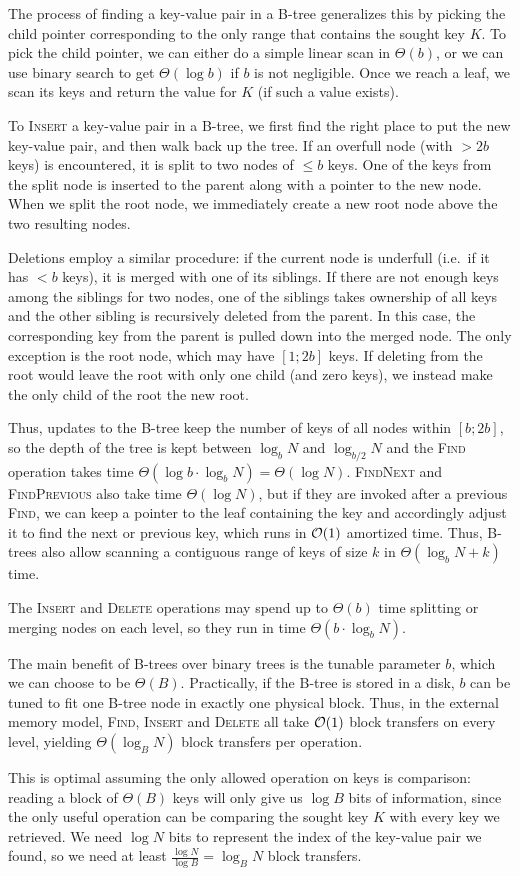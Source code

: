 The process of finding a key-value pair in a B-tree generalizes this
by picking the child pointer corresponding to the only range that contains
the sought key $K$. To pick the child pointer, we can either do a simple
linear scan in $\Theta(b)$, or we can use binary search to get
$\Theta(\log b)$ if $b$ is not negligible.
Once we reach a leaf, we scan its keys and return the value for $K$
(if such a value exists).

To \textsc{Insert} a key-value pair in a B-tree, we first find the right
place to put the new key-value pair, and then walk back up the tree.
If an overfull node (with $> 2b$ keys) is encountered, it is split
to two nodes of $\leq b$ keys. One of the keys from the split node
is inserted to the parent along with a pointer to the new node.
When we split the root node, we immediately create a new root node above the
two resulting nodes.

Deletions employ a similar procedure: if the current node is underfull
(i.e.\ if it has $< b$ keys), it is merged with one of its siblings.
If there are not enough keys among the siblings for two nodes,
one of the siblings takes ownership of all keys and the other sibling
is recursively deleted from the parent. In this case, the corresponding
key from the parent is pulled down into the merged node.
The only exception is the root node, which may have $[1;2b]$ keys.
If deleting from the root would leave the root with only one child
(and zero keys), we instead make the only child of the root the new root.

Thus, updates to the B-tree keep the number of keys of all nodes within
$[b;2b]$, so the depth of the tree is kept between $\log_b N$ and
$\log_{b/2} N$ and the \textsc{Find} operation takes time
$\Theta(\log b \cdot \log_b N)=\Theta(\log N)$. \textsc{FindNext} and
\textsc{FindPrevious} also take time $\Theta(\log N)$, but if they are invoked
after a previous \textsc{Find}, we can keep a pointer to the leaf containing
the key and accordingly adjust it to find the next or previous key, which runs
in $\mathcal{O}(1)$ amortized time. Thus, B-trees also allow scanning a contiguous
range of keys of size $k$ in $\Theta(\log_b N + k)$ time.

The \textsc{Insert} and \textsc{Delete} operations may spend up to
$\Theta(b)$ time splitting or merging nodes on each level, so they run in
time $\Theta(b \cdot \log_b N)$.

The main benefit of B-trees over binary trees is the tunable parameter
$b$, which we can choose to be $\Theta(B)$. Practically, if the B-tree
is stored in a disk, $b$ can be tuned to fit one B-tree node in exactly one
physical block. Thus, in the external memory model, \textsc{Find},
\textsc{Insert} and \textsc{Delete} all take $\mathcal{O}(1)$ block transfers
on every level, yielding $\Theta(\log_B N)$ block transfers per operation.

This is optimal assuming the only allowed operation
on keys is comparison: reading a block of $\Theta(B)$ keys will only
give us $\log B$ bits of information, since the only useful operation
can be comparing the sought key $K$ with every key we retrieved.
We need $\log N$ bits to represent the index of the key-value pair we found,
so we need at least $\frac{\log N}{\log B}=\log_B N$ block transfers.
